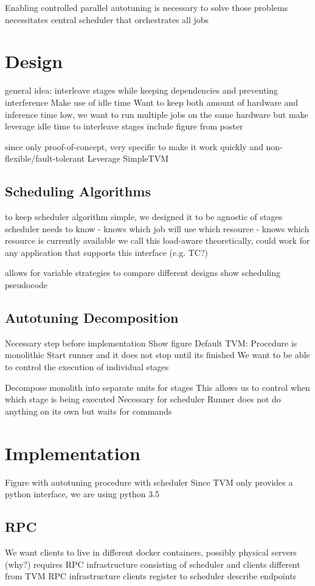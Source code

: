 Enabling controlled parallel autotuning is necessary to solve those problems
necessitates central scheduler that orchestrates all jobs

\section{Design}
general idea: interleave stages while keeping dependencies and preventing interference
Make use of idle time
Want to keep both amount of hardware and inference time low, we want to run multiple jobs on the same hardware but make leverage idle time to interleave stages
include figure from poster

since only proof-of-concept, very specific to make it work quickly and non-flexible/fault-tolerant
Leverage SimpleTVM

\subsection{Scheduling Algorithms}
to keep scheduler algorithm simple, we designed it to be agnostic of stages
scheduler needs to know
- knows which job will use which resource
- knows which resource is currently available
we call this load-aware
theoretically, could work for any application that supports this interface (e.g. TC?)

allows for variable strategies to compare different designs
show scheduling pseudocode

\subsection{Autotuning Decomposition}
Necessary step before implementation
Show figure
Default TVM:
Procedure is monolithic
Start runner and it does not stop until its finished
We want to be able to control the execution of individual stages

Decompose monolith into separate units for stages
This allows us to control when which stage is being executed
Necessary for scheduler
Runner does not do anything on its own but waits for commands

\section{Implementation}
Figure with autotuning procedure with scheduler
Since TVM only provides a python interface, we are using python 3.5

\subsection{RPC}
We want clients to live in different docker containers, possibly physical servers (why?)
requires RPC infrastructure consisting of scheduler and clients
different from TVM RPC infrastructure
clients register to scheduler
describe endpoints

